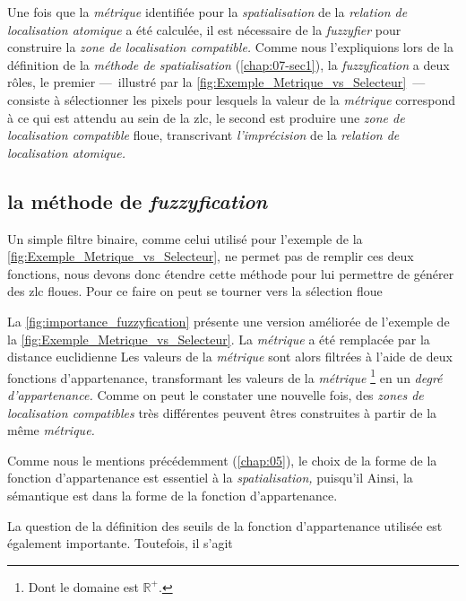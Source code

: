 Une fois que la \emph{métrique} identifiée pour la \emph{spatialisation} de la \emph{relation de localisation atomique} a été calculée, il est nécessaire de la \emph{fuzzyfier} pour construire la \emph{zone de localisation compatible.} Comme nous l'expliquions lors de la définition de la \emph{méthode de spatialisation} (\autoref{chap:07-sec1}), la \emph{fuzzyfication} a deux rôles, le premier ---~illustré par la \autoref{fig:Exemple_Metrique_vs_Selecteur}~--- consiste à sélectionner les pixels pour lesquels la valeur de la \emph{métrique} correspond à ce qui est attendu au sein de la \ac{zlc}, le second est produire une \emph{zone de localisation compatible} floue, transcrivant \emph{l'imprécision} de la \emph{relation de localisation atomique.}

\subsection{la méthode de \emph{fuzzyfication}}

Un simple filtre binaire, comme celui utilisé pour l'exemple de la \autoref{fig:Exemple_Metrique_vs_Selecteur}, ne permet pas de remplir ces deux fonctions, nous devons donc étendre cette méthode pour lui permettre de générer des \ac{zlc} floues. Pour ce faire on peut se tourner vers la sélection floue

La \autoref{fig:importance_fuzzyfication} présente une version améliorée de l'exemple de la \autoref{fig:Exemple_Metrique_vs_Selecteur}. La \emph{métrique} a été remplacée par la distance euclidienne
%
Les valeurs de la \emph{métrique} sont alors filtrées à l'aide de deux fonctions d'appartenance, transformant les valeurs de la \emph{métrique} \footnote{Dont le domaine est \(\mathbb{R}^+\).} en un \emph{degré d'appartenance.} Comme on peut le constater une nouvelle fois, des \emph{zones de localisation compatibles} très différentes peuvent êtres construites à partir de la même \emph{métrique.}



%
Comme nous le mentions précédemment (\autoref{chap:05}), le choix de la forme de la fonction d'appartenance est essentiel à la \emph{spatialisation,} puisqu'il
%
Ainsi, la sémantique est dans la forme de la fonction d'appartenance.

%
La question de la définition des seuils de la fonction d'appartenance utilisée est également importante. Toutefois, il s'agit 

